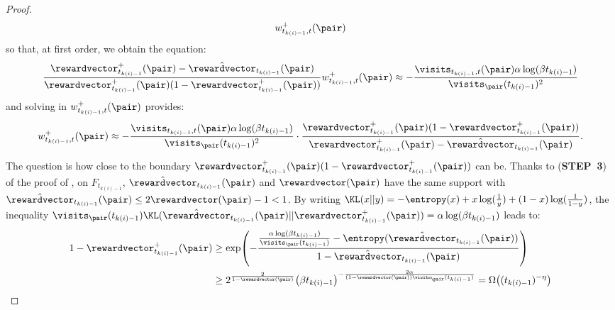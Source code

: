\documentclass[preprint,cleveref,12pt]{colt2025}
\DeclarePairedDelimiter{\parens}{(}{)}	%
\def\reward{\rewardvector}
\def\STEP#1{(\strong{STEP~#1})}
\newcommand{\strong}[1]{\textbf{#1}}
\begin{document}
\begin{proof}
\begin{equation*}
            w^+_{t_{k(i)-1}, t}(\pair)
        \end{equation*}
        so that, at first order, we obtain the equation:
        \begin{equation*}
            \frac{\reward^+_{t_{k(i)-1}}(\pair) - \hat{\reward}_{t_{k(i)-1}}(\pair)}{\reward^+_{t_{k(i)-1}}(\pair)(1 - \reward^+_{t_{k(i)-1}}(\pair))}
            w^+_{t_{k(i)-1}, t}(\pair)
            \approx
            - \frac{\visits_{t_{k(i)-1}, t}(\pair) \alpha \log(\beta t_{k(i)-1})}{\visits_\pair (t_{k(i)-1})^2}
        \end{equation*}
        and solving in $w^+_{t_{k(i)-1}, t}(\pair)$ provides:
        \begin{equation}
        \label{equation_proof_shrinking_rewards_2}
            w^+_{t_{k(i)-1}, t}(\pair)
            \approx
            - \frac{\visits_{t_{k(i)-1}, t}(\pair) \alpha \log(\beta t_{k(i)-1})}{\visits_\pair (t_{k(i)-1})^2}
            \cdot 
            \frac{\reward^+_{t_{k(i)-1}}(\pair)(1 - \reward^+_{t_{k(i)-1}}(\pair))}{\reward^+_{t_{k(i)-1}}(\pair) - \hat{\reward}_{t_{k(i)-1}}(\pair)}
            .
        \end{equation}
        The question is how close to the boundary ${\reward^+_{t_{k(i)-1}}(\pair)(1 - \reward^+_{t_{k(i)-1}}(\pair))}$ can be. 
        Thanks to \STEP{3} of the proof of , on $F_{t_{k(i)-1}}$, $\hat{\reward}_{t_{k(i)-1}}(\pair)$ and $\reward(\pair)$ have the same support with $\hat{\reward}_{t_{k(i)-1}}(\pair) \le 2 \reward(\pair) - 1 < 1$. 
        By writing $\KL(x||y) = - \entropy(x) + x \log (\frac 1y) + (1 - x) \log(\frac 1{1-y})$, the inequality $\visits_\pair(t_{k(i)-1}) \KL(\hat{\reward}_{t_{k(i)-1}}(\pair)||\reward^+_{t_{k(i)-1}}(\pair)) = \alpha \log (\beta t_{k(i)-1})$ leads to:
        \begin{align}
            1 - \reward^+_{t_{k(i)-1}}(\pair)
            & \ge
            \notag
            \exp \parens*{
                - \frac{\frac{\alpha \log(\beta t_{k(i)-1})}{\visits_\pair (t_{k(i)-1}) } - \entropy(\hat{\reward}_{t_{k(i)-1}}(\pair))}{1 - \hat{\reward}_{t_{k(i)-1}}(\pair)}
            }
            \\
            & \ge
            \label{equation_proof_shrinking_rewards_3}
            2^{\frac 2{1 - \reward(\pair)}}
            \parens*{
                \beta t_{k(i)-1}
            }^{
                - \frac{2 \alpha}{(1 - \reward(\pair)) \visits_\pair(t_{k(i)-1})}
            }
            = \Omega \parens*{
                (t_{k(i)-1})^{-\eta}
}
\end{align}
\end{proof}
\end{document}
